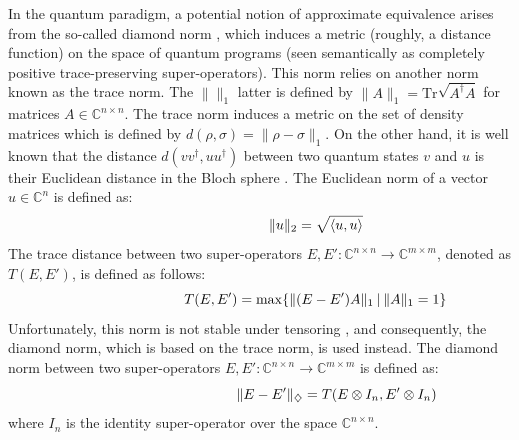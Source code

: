 In the quantum paradigm, a potential notion of approximate equivalence arises from the so-called diamond norm \cite{watrous2018theory}, which induces a metric (roughly, a distance function) on the space of quantum programs (seen semantically as completely positive trace-preserving super-operators). This norm relies on another norm known as the trace norm. The $\lVert  \rVert_{1}$ latter is defined by  $\lVert A \rVert_{1} = \text{Tr}\sqrt{A^{\dag}A}$  for matrices $A \in \mathbb{C}^{n\times n}$. The trace norm induces a metric on the set of density matrices which is defined by $d(\rho, \sigma) = \lVert \rho -\sigma\rVert_{1}$. On the other hand, it is well known that the distance $d(vv^{\dag}, uu^{\dag})$ between two quantum states $v$ and $u$ is their Euclidean distance in the Bloch
sphere \cite{wallman2016noise,nielsen2010quantum}. The Euclidean norm of a vector $u \in \mathbb{C}^{n} $ is defined as:
\begin{equation} \label{eq:euclidean_distance}
\begin{centering}
\hspace{80pt}
\lVert u \rVert_{2} = \sqrt{\langle u, u\rangle} 
 \end{centering}
\end{equation}
The trace distance between two super-operators $E, E': \mathbb{C}^{n\times n} \xrightarrow{} \mathbb{C}^{m\times m }$,  denoted as $T(E,E')$, is defined as follows:
\begin{equation} \label{eq:trace_distance}
\begin{centering}
\hspace{80pt}
 T(E,E')= \max\{\lVert (E-E') A \rVert_{1} \hspace{2pt}  \vert \hspace{2pt}  \lVert A \rVert_{1}=1\} 
 \end{centering}
\end{equation}
Unfortunately, this norm is not stable under tensoring \cite{watrous2018theory}, and consequently, the diamond norm, which is based on the trace norm, is used instead. The diamond norm between two super-operators $E, E': \mathbb{C}^{n\times n} \xrightarrow{} \mathbb{C}^{m\times m }$ is defined as:
\begin{equation}  \label{eq:diamond_distance}
\begin{centering}
\hspace{110pt}
 \lVert E-E'\rVert_{\diamondsuit} =  T(E \otimes I_{n},E' \otimes I_{n}) 
 \end{centering}
\end{equation}
where $I_{n} $ is the identity super-operator over the space $\mathbb{C}^{n\times n}$.


